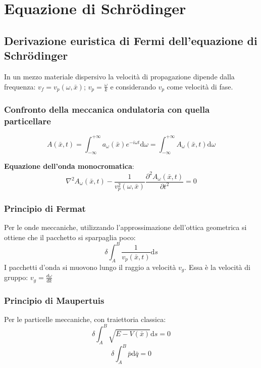 \chapter{Equazione di Schrödinger} %
\section{Derivazione euristica di Fermi dell'equazione di Schrödinger}
In un mezzo materiale dispersivo la velocità di propagazione dipende dalla frequenza: $v_f=v_p(\omega, \bar x)$; $v_p=\frac{\omega}{k}$ e considerando $v_p$ come velocità di fase.

\subsection{Confronto della meccanica ondulatoria con quella particellare}
\[
A\left(\bar x, t\right)=\int_{-\infty }^{+\infty }{a_{\omega}(\bar x)e^{-i\omega t} \textrm{d}\omega}=\int_{-\infty}^{+\infty}{A_\omega(\bar x,t) \textrm{d}\omega}
\]

\textbf{Equazione dell'onda monocromatica}:
\begin{equation}
\nabla ^2A_{\omega }\left(\bar x, t\right)-\frac{1}{v^2_p (\omega,\bar x)}\frac{\partial ^2A_{\omega }\left(\bar x, t\right)}{\partial t^2}=0
\end{equation}

\subsection{Principio di Fermat} %
Per le onde meccaniche, utilizzando l'approssimazione dell'ottica geometrica si ottiene che il pacchetto si sparpaglia poco:
\begin{equation}
\delta \int_{A}^{B}{\frac{1}{v_p(\bar x,t)} \textrm{d}s}
\end{equation}
I pacchetti d'onda si muovono lungo il raggio a velocità $v_g$.
Essa è la velocità di gruppo: $v_g=\frac{d\omega}{dk}$

\subsection{Principio di Maupertuis} %
Per le particelle meccaniche, con traiettoria classica:
\begin{equation}
\delta \int_{A}^{B}{\sqrt{E-V(\bar x)} \textrm{d}s}=0
\end{equation}
\begin{equation}
\delta \int_{A}^{B}{\bar p \textrm{d}\bar q}=0
\end{equation}

